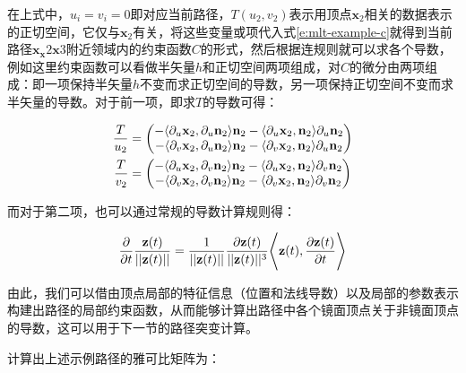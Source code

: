 \noindent 在上式中，$u_i=v_i=0$即对应当前路径，$T(u_2,v_2)$表示用顶点$\mathbf{x}_2$相关的数据表示的正切空间，它仅与$\mathbf{x}_2$有关，将这些变量或项代入式\ref{e:mlt-example-c}就得到当前路径$\mathbf{x}_\mathbf{x}2\mathbf{x}3$附近领域内的约束函数$C$的形式，然后根据连规则就可以求各个导数，例如这里约束函数可以看做半矢量$h$和正切空间两项组成，对$C$的微分由两项组成：即一项保持半矢量$h$不变而求正切空间的导数，另一项保持正切空间不变而求半矢量的导数。对于前一项，即求$T$的导数可得：

\begin{equation}
\begin{aligned}
	\frac{T}{u_2}&=\begin{pmatrix}
		-\langle{\rm \partial}_u\mathbf{x}_2,{\rm \partial}_u\mathbf{n}_2\rangle\mathbf{n}_2-\langle{\rm \partial}_u\mathbf{x}_2,\mathbf{n}_2\rangle{\rm \partial}_u\mathbf{n}_2\\
		-\langle{\rm \partial}_v\mathbf{x}_2,{\rm \partial}_u\mathbf{n}_2\rangle\mathbf{n}_2-\langle{\rm \partial}_v\mathbf{x}_2,\mathbf{n}_2\rangle{\rm \partial}_u\mathbf{n}_2
	\end{pmatrix}\\
	\frac{T}{v_2}&=\begin{pmatrix}
		-\langle{\rm \partial}_u\mathbf{x}_2,{\rm \partial}_v\mathbf{n}_2\rangle\mathbf{n}_2-\langle{\rm \partial}_u\mathbf{x}_2,\mathbf{n}_2\rangle{\rm \partial}_v\mathbf{n}_2\\
		-\langle{\rm \partial}_v\mathbf{x}_2,{\rm \partial}_v\mathbf{n}_2\rangle\mathbf{n}_2-\langle{\rm \partial}_v\mathbf{x}_2,\mathbf{n}_2\rangle{\rm \partial}_v\mathbf{n}_2
	\end{pmatrix}
\end{aligned}
\end{equation}

\noindent 而对于第二项，也可以通过常规的导数计算规则得：

\begin{equation}
	\frac{{\rm \partial}}{{\rm \partial} t}\frac{\mathbf{z}(t)}{||\mathbf{z}(t)||}=\frac{1}{||\mathbf{z}(t)||}\frac{{\rm \partial}\mathbf{z}(t)}{||\mathbf{z}(t)||^{3}}\Bigg\langle\mathbf{z}(t),\frac{{\rm \partial}\mathbf{z}(t)}{{\rm \partial} t}\Bigg\rangle
\end{equation}

由此，我们可以借由顶点局部的特征信息（位置和法线导数）以及局部的参数表示构建出路径的局部约束函数，从而能够计算出路径中各个镜面顶点关于非镜面顶点的导数，这可以用于下一节的路径突变计算。

\cite{a:LIGHTTRANSPORTONPATHSPACEMANIFOLDS}计算出上述示例路径的雅可比矩阵为：

